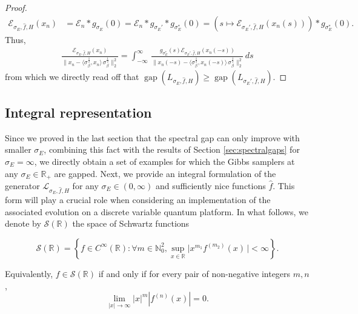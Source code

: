 \documentclass[11pt]{amsart}
\newcommand{\1}{\mathbbm{1}}
\newtheorem{conditionC}{Condition}
\theoremstyle{plain}
\theoremstyle{definition}
\theoremstyle{remark}
\numberwithin{equation}{section}
\begin{document}
\begin{proof}
\begin{align*}
\mathcal{E}_{\sigma_E,\widehat{f},H}(x_n)&=\mathcal{E}_n\ast g_{\sigma_E}(0)=\mathcal{E}_n\ast g_{\sigma_E'}\ast g_{\sigma_E^*}(0)=(s\mapsto \mathcal{E}_{\sigma_E',\widehat{f},H}(x_n(s)))\ast g_{\sigma_E^*}(0).
\end{align*}
Thus,
\begin{align*}
 \tfrac{\mathcal{E}_{\sigma_E,\widehat{f},H}(x_n)}{\Big\|x_n-\langle \sigma_\beta^{\frac{1}{2}},x_n\rangle\,\sigma_\beta^{\frac{1}{2}}\Big\|_{2}^2}=\int_{-\infty}^\infty \,\tfrac{g_{\sigma_E^*}(s)\mathcal{E}_{\sigma_E',\widehat{f},H}(x_n(-s))}{\Big\|x_n(-s)-\langle \sigma_\beta^{\frac{1}{2}},x_n(-s)\rangle\,\sigma_\beta^{\frac{1}{2}}\Big\|_{2}^2}\,ds
\end{align*}
from which we directly read off that $\operatorname{gap}({L}_{\sigma_E,\widehat{f},H})\ge \operatorname{gap}({L}_{\sigma_E',\widehat{f},H})$.
\end{proof}


\subsection{Integral representation}\label{integralrepfschwartz}

Since we proved in the last section that the spectral gap can only improve with smaller $\sigma_E$, combining this fact with the results of Section \ref{sec:spectralgaps} for $\sigma_E=\infty$, we directly obtain a set of examples for which the Gibbs samplers at any $\sigma_E\in \mathbb{R}_+$ are gapped. Next, we provide an integral formulation of the generator $\mathcal{L}_{\sigma_E,\widehat{f},H}$ for any $\sigma_E\in(0,\infty)$ and sufficiently nice functions $\widehat{f}$. This form will play a crucial role when considering an implementation of the associated evolution on a discrete variable quantum platform. In what follows, we denote by $\mathcal{S}(\mathbb{R})$ the space of Schwartz functions 

\[
\mathcal{S}(\mathbb{R})
\!=\!\left\{
f\in C^{\infty}(\mathbb{R})\!:\!
\forall m\in\mathbb{N}_0^2,
\sup_{x\in\mathbb{R}}
\big|x^{m_1}f^{(m_2)}(x)\,\big|\!<\!\infty\!
\right\}.
\]

\noindent
Equivalently, \(f\in\mathcal{S}(\mathbb{R})\) if and only if for every pair of non-negative integers \(m,n\),
\[
\lim_{|x|\to\infty} |x|^m |f^{(n)}(x)| = 0.
\]



\end{document}

